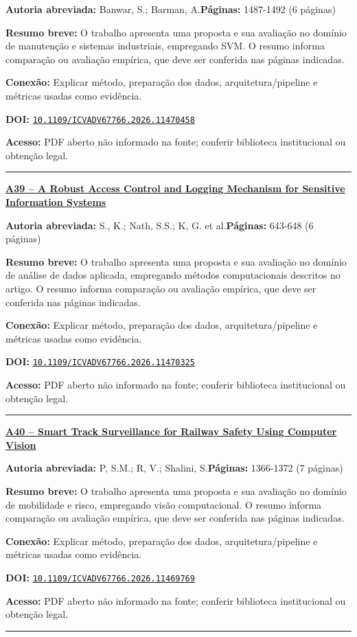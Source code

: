\documentclass[10pt,a4paper]{article}
\begin{document}
\textbf{Autoria abreviada:} Banwar, S.; Barman, A.\quad \textbf{Páginas:} 1487-1492 (6 páginas)\par
\textbf{Resumo breve:} O trabalho apresenta uma proposta e sua avaliação no domínio de manutenção e sistemas industriais, empregando SVM. O resumo informa comparação ou avaliação empírica, que deve ser conferida nas páginas indicadas.\par
\textbf{Conexão:} Explicar método, preparação dos dados, arquitetura/pipeline e métricas usadas como evidência.\par
\textbf{DOI:} \href{https://doi.org/10.1109/ICVADV67766.2026.11470458}{\nolinkurl{10.1109/ICVADV67766.2026.11470458}}\par
\textbf{Acesso:} PDF aberto não informado na fonte; conferir biblioteca institucional ou obtenção legal.\par
\noindent\rule{\textwidth}{0.35pt}
\par\medskip\noindent
{\large\bfseries\href{https://doi.org/10.1109/ICVADV67766.2026.11470325}{A39 -- A Robust Access Control and Logging Mechanism for Sensitive Information Systems}}\par\smallskip
\textbf{Autoria abreviada:} S., K.; Nath, S.S.; K, G. et al.\quad \textbf{Páginas:} 643-648 (6 páginas)\par
\textbf{Resumo breve:} O trabalho apresenta uma proposta e sua avaliação no domínio de análise de dados aplicada, empregando métodos computacionais descritos no artigo. O resumo informa comparação ou avaliação empírica, que deve ser conferida nas páginas indicadas.\par
\textbf{Conexão:} Explicar método, preparação dos dados, arquitetura/pipeline e métricas usadas como evidência.\par
\textbf{DOI:} \href{https://doi.org/10.1109/ICVADV67766.2026.11470325}{\nolinkurl{10.1109/ICVADV67766.2026.11470325}}\par
\textbf{Acesso:} PDF aberto não informado na fonte; conferir biblioteca institucional ou obtenção legal.\par
\noindent\rule{\textwidth}{0.35pt}
\par\medskip\noindent
{\large\bfseries\href{https://doi.org/10.1109/ICVADV67766.2026.11469769}{A40 -- Smart Track Surveillance for Railway Safety Using Computer Vision}}\par\smallskip
\textbf{Autoria abreviada:} P, S.M.; R, V.; Shalini, S.\quad \textbf{Páginas:} 1366-1372 (7 páginas)\par
\textbf{Resumo breve:} O trabalho apresenta uma proposta e sua avaliação no domínio de mobilidade e risco, empregando visão computacional. O resumo informa comparação ou avaliação empírica, que deve ser conferida nas páginas indicadas.\par
\textbf{Conexão:} Explicar método, preparação dos dados, arquitetura/pipeline e métricas usadas como evidência.\par
\textbf{DOI:} \href{https://doi.org/10.1109/ICVADV67766.2026.11469769}{\nolinkurl{10.1109/ICVADV67766.2026.11469769}}\par
\textbf{Acesso:} PDF aberto não informado na fonte; conferir biblioteca institucional ou obtenção legal.\par
\noindent\rule{\textwidth}{0.35pt}
\clearpage
\end{document}
